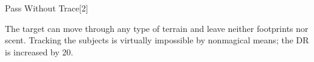\begin{spellsection}{Pass Without Trace}[2]
    \begin{spellheader}
    \end{spellheader}
    \begin{spellcontent}
        \begin{spelltargetinginfo}
        \end{spelltargetinginfo}
        \begin{spelleffects}
            \spelleffect The target can move through any type of terrain and leave neither footprints nor scent. Tracking the subjects is virtually impossible by nonmagical means; the DR is increased by 20.
            \spelldur \durlong \dismissable
        \end{spelleffects}
    \end{spellcontent}
    \begin{spellfooter}
    \end{spellfooter}
    \begin{spellaugments}
    \end{spellaugments}
\end{spellsection}

